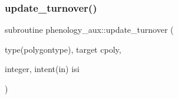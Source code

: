 \mbox{\label{namespacephenology__aux_a7a199ed988a720b2e56c3b5e1407995a}} 
\subsubsection{\texorpdfstring{update\+\_\+turnover()}{update\_turnover()}}
{\footnotesize\ttfamily subroutine phenology\+\_\+aux\+::update\+\_\+turnover (\begin{DoxyParamCaption}\item[{type(polygontype), target}]{cpoly,  }\item[{integer, intent(in)}]{isi }\end{DoxyParamCaption})}

